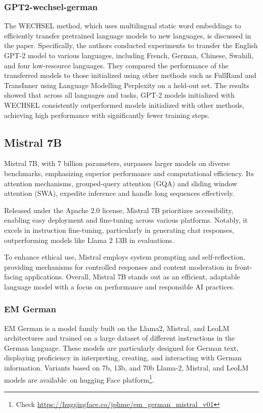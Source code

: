 \subsubsection{GPT2-wechsel-german}

The WECHSEL method, which uses multilingual static word embeddings to efficiently transfer pretrained language models to new languages, is discussed in the paper\cite{minixhofer-etal-2022-wechsel}. Specifically, the authors conducted experiments to transfer the English GPT-2 model to various languages, including French, German, Chinese, Swahili, and four low-resource languages. They compared the performance of the transferred models to those initialized using other methods such as FullRand and TransInner using Language Modelling Perplexity on a held-out set. The results showed that across all languages and tasks, GPT-2 models initialized with WECHSEL consistently outperformed models initialized with other methods, achieving high performance with significantly fewer training steps.

\subsection{Mistral 7B}\label{mistral}
Mistral 7B, with 7 billion parameters, surpasses larger models on diverse benchmarks, emphasizing superior performance and computational efficiency. Its attention mechanisms, grouped-query attention (GQA) and sliding window attention (SWA), expedite inference and handle long sequences effectively. \cite{jiang2023mistral}

Released under the Apache 2.0 license, Mistral 7B prioritizes accessibility, enabling easy deployment and fine-tuning across various platforms. Notably, it excels in instruction fine-tuning, particularly in generating chat responses, outperforming models like Llama 2 13B in evaluations.\cite{jiang2023mistral}

To enhance ethical use, Mistral employs system prompting and self-reflection, providing mechanisms for controlled responses and content moderation in front-facing applications. Overall, Mistral 7B stands out as an efficient, adaptable language model with a focus on performance and responsible AI practices.\cite{jiang2023mistral}

\subsubsection{EM German}
EM German is a model family built on the Llama2, Mistral, and LeoLM architectures and trained on a large dataset of different instructions in the German language. These models are particularly designed for German text, displaying proficiency in interpreting, creating, and interacting with German information. Variants based on 7b, 13b, and 70b Llama-2, Mistral, and LeoLM models are available on hugging Face platform\footnote{Check \url{https://huggingface.co/jphme/em_german_mistral_v01}}.\cite{jphme2023}

